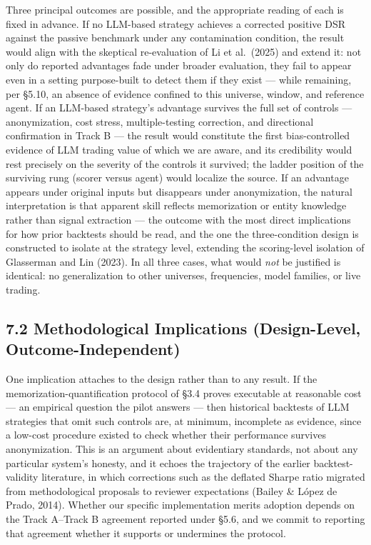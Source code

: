 \documentclass[
  12pt,
]{article}
\begin{document}
Three principal outcomes are possible, and the appropriate reading of
each is fixed in advance. If no LLM-based strategy achieves a corrected
positive DSR against the passive benchmark under any contamination
condition, the result would align with the skeptical re-evaluation of Li
et al.~(2025) and extend it: not only do reported advantages fade under
broader evaluation, they fail to appear even in a setting purpose-built
to detect them if they exist --- while remaining, per §5.10, an absence
of evidence confined to this universe, window, and reference agent. If
an LLM-based strategy's advantage survives the full set of controls ---
anonymization, cost stress, multiple-testing correction, and directional
confirmation in Track B --- the result would constitute the first
bias-controlled evidence of LLM trading value of which we are aware, and
its credibility would rest precisely on the severity of the controls it
survived; the ladder position of the surviving rung (scorer versus
agent) would localize the source. If an advantage appears under original
inputs but disappears under anonymization, the natural interpretation is
that apparent skill reflects memorization or entity knowledge rather
than signal extraction --- the outcome with the most direct implications
for how prior backtests should be read, and the one the three-condition
design is constructed to isolate at the strategy level, extending the
scoring-level isolation of Glasserman and Lin (2023). In all three
cases, what would \emph{not} be justified is identical: no
generalization to other universes, frequencies, model families, or live
trading.

\hypertarget{methodological-implications-design-level-outcome-independent}{%
\subsection{7.2 Methodological Implications (Design-Level,
Outcome-Independent)}\label{methodological-implications-design-level-outcome-independent}}

One implication attaches to the design rather than to any result. If the
memorization-quantification protocol of §3.4 proves executable at
reasonable cost --- an empirical question the pilot answers --- then
historical backtests of LLM strategies that omit such controls are, at
minimum, incomplete as evidence, since a low-cost procedure existed to
check whether their performance survives anonymization. This is an
argument about evidentiary standards, not about any particular system's
honesty, and it echoes the trajectory of the earlier backtest-validity
literature, in which corrections such as the deflated Sharpe ratio
migrated from methodological proposals to reviewer expectations (Bailey
\& López de Prado, 2014). Whether our specific implementation merits
adoption depends on the Track A--Track B agreement reported under §5.6,
and we commit to reporting that agreement whether it supports or
undermines the protocol.
\end{document}
